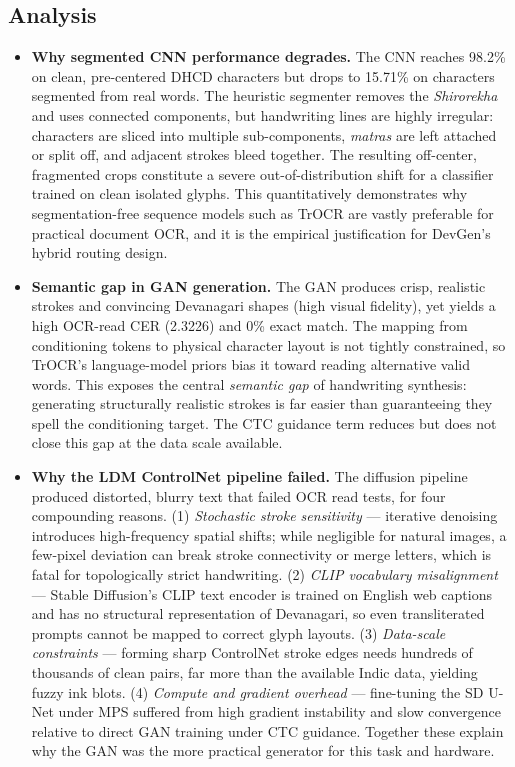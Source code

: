 \documentclass[12pt,a4paper]{report}
\begin{document}
\subsection{Analysis}
\begin{itemize}[itemsep=4pt]
  \item \textbf{Why segmented CNN performance degrades.} The CNN reaches 98.2\% on clean, pre-centered DHCD characters but drops to 15.71\% on characters segmented from real words. The heuristic segmenter removes the \textit{Shirorekha} and uses connected components, but handwriting lines are highly irregular: characters are sliced into multiple sub-components, \textit{matras} are left attached or split off, and adjacent strokes bleed together. The resulting off-center, fragmented crops constitute a severe out-of-distribution shift for a classifier trained on clean isolated glyphs. This quantitatively demonstrates why segmentation-free sequence models such as TrOCR are vastly preferable for practical document OCR, and it is the empirical justification for DevGen's hybrid routing design.
  \item \textbf{Semantic gap in GAN generation.} The GAN produces crisp, realistic strokes and convincing Devanagari shapes (high visual fidelity), yet yields a high OCR-read CER (2.3226) and 0\% exact match. The mapping from conditioning tokens to physical character layout is not tightly constrained, so TrOCR's language-model priors bias it toward reading alternative valid words. This exposes the central \textit{semantic gap} of handwriting synthesis: generating structurally realistic strokes is far easier than guaranteeing they spell the conditioning target. The CTC guidance term reduces but does not close this gap at the data scale available.
  \item \textbf{Why the LDM ControlNet pipeline failed.} The diffusion pipeline produced distorted, blurry text that failed OCR read tests, for four compounding reasons. (1) \textit{Stochastic stroke sensitivity} --- iterative denoising introduces high-frequency spatial shifts; while negligible for natural images, a few-pixel deviation can break stroke connectivity or merge letters, which is fatal for topologically strict handwriting. (2) \textit{CLIP vocabulary misalignment} --- Stable Diffusion's CLIP text encoder is trained on English web captions and has no structural representation of Devanagari, so even transliterated prompts cannot be mapped to correct glyph layouts. (3) \textit{Data-scale constraints} --- forming sharp ControlNet stroke edges needs hundreds of thousands of clean pairs, far more than the available Indic data, yielding fuzzy ink blots. (4) \textit{Compute and gradient overhead} --- fine-tuning the SD U-Net under MPS suffered from high gradient instability and slow convergence relative to direct GAN training under CTC guidance. Together these explain why the GAN was the more practical generator for this task and hardware.
\end{itemize}
\end{document}
